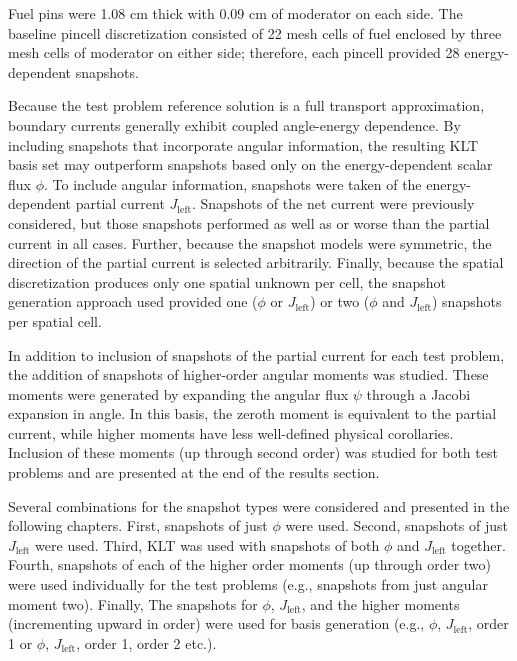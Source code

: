Fuel pins were 1.08 cm thick with 0.09 cm of moderator on each side. The 
baseline pincell discretization consisted of 22 mesh cells of fuel enclosed by 
three mesh cells of moderator on either side; therefore, each pincell provided
28 energy-dependent snapshots.

Because the test problem reference solution is a full transport approximation, 
boundary currents generally exhibit coupled angle-energy dependence.  By 
including snapshots that incorporate angular information, the resulting KLT 
basis set
may outperform snapshots based only on the energy-dependent scalar flux $\phi$. 
 To include angular information, snapshots were taken of the energy-dependent 
partial current $J_{\text{left}}$. Snapshots of the net current were previously 
considered, but those snapshots performed as well as or worse than the partial 
current in all cases.  Further, because the snapshot models were symmetric, the 
direction of the partial current is selected arbitrarily. Finally, because the
spatial discretization produces only 
one spatial unknown per cell, the snapshot generation approach used provided 
one 
($\phi$ or $J_{\text{left}}$) or two ($\phi$ and $J_{\text{left}}$) snapshots 
per spatial cell.

In addition to inclusion of snapshots of the partial current for each test 
problem, 
the addition of snapshots of higher-order angular moments was studied.  These 
moments were generated by expanding the angular flux $\psi$ through a Jacobi 
expansion in angle.  In this basis, the zeroth moment is equivalent to the 
partial current, while higher moments have less well-defined physical corollaries.  
Inclusion of these moments (up through second order) was studied for both test 
problems and are presented at the end of the results section.

Several combinations for the snapshot types were considered and presented in 
the following chapters.  First, snapshots of just $\phi$ were used.  Second, 
snapshots of just $J_{\text{left}}$ were used.  Third, KLT was used 
with snapshots of both $\phi$ and $J_{\text{left}}$ together.  Fourth, snapshots 
of each of the 
higher order moments (up through order two) were used individually for the test 
problems (e.g., snapshots from just angular moment two).  Finally, The 
snapshots for $\phi$, $J_{\text{left}}$, and the higher moments (incrementing 
upward in order) were used for basis generation (e.g., $\phi$, 
$J_{\text{left}}$, 
order 1 or $\phi$, $J_{\text{left}}$, order 1, order 2 etc.).

